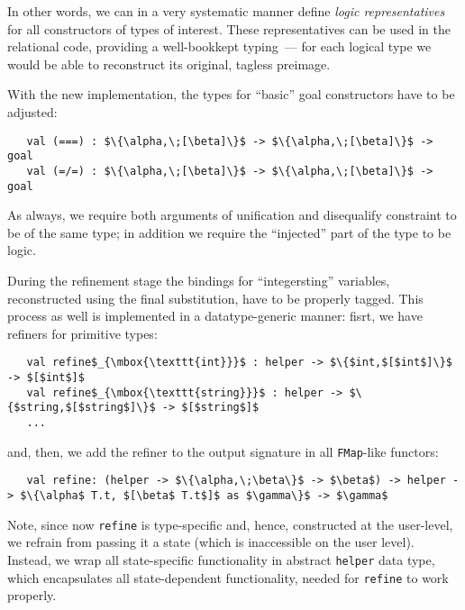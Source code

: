 In other words, we can in a very systematic manner define \emph{logic representatives} for all constructors
of types of interest. These representatives can be used in the relational code, providing a well-bookkept
typing~--- for each logical type we would be able to reconstruct its original, tagless preimage. 

With the new implementation, the types for ``basic'' goal constructors have to be adjusted:

\begin{lstlisting}
   val (===) : $\{\alpha,\;[\beta]\}$ -> $\{\alpha,\;[\beta]\}$ -> goal
   val (=/=) : $\{\alpha,\;[\beta]\}$ -> $\{\alpha,\;[\beta]\}$ -> goal
\end{lstlisting}

As always, we require both arguments of unification and disequalify constraint to be of the same type; in addition
we require the ``injected'' part of the type to be logic.

During the refinement stage the bindings for ``integersting'' variables, reconstructed using the final
substitution, have to be properly tagged. This process as well is implemented in a datatype-generic manner:
fisrt, we have refiners for primitive types:

\begin{lstlisting}
   val refine$_{\mbox{\texttt{int}}}$ : helper -> $\{$int,$[$int$]\}$ -> $[$int$]$
   val refine$_{\mbox{\texttt{string}}}$ : helper -> $\{$string,$[$string$]\}$ -> $[$string$]$
   ...  
\end{lstlisting}

and, then, we add the refiner to the output signature in all \lstinline{FMap}-like functors:

\begin{lstlisting}
   val refine: (helper -> $\{\alpha,\;\beta\}$ -> $\beta$) -> helper -> $\{\alpha$ T.t, $[\beta$ T.t$]$ as $\gamma\}$ -> $\gamma$
\end{lstlisting}

Note, since now \lstinline{refine} is type-specific and, hence, constructed at the user-level, we refrain from passing 
it a state (which is inaccessible on the user level). Instead, we wrap all state-specific functionality in 
abstract \lstinline{helper} data type, which encapsulates all state-dependent functionality, needed for \lstinline{refine} 
to work properly.
